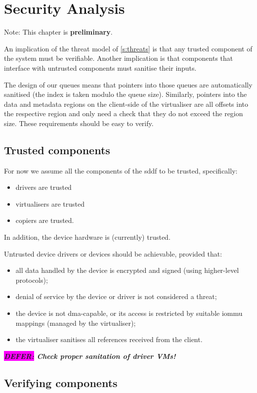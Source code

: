 \documentclass[a4paper,12pt]{report}
\newcommand{\DEFER}[1]{\textbf{\textsl{\colorbox{magenta}{DEFER:} #1}}}
\newcommand{\DEFER}[1]{\relax}
\begin{document}
\chapter{Security Analysis}\label{s:security}

Note: This chapter is \textbf{preliminary}.

An implication of the threat model of \autoref{s:threats} is that any
trusted component of the system must be verifiable. Another implication is
that components that interface with untrusted components must sanitise
their inputs.

The design of our queues means that
pointers into those queues are automatically sanitised (the index is
taken modulo the queue size). Similarly, pointers into the data and metadata
regions on the client-side of the virtualiser are all offsets into the
respective region and only need a check that they do not exceed the
region size. These requirements should be easy to verify.

\section{Trusted components}

For now we assume all the components of the \gls{sddf} to be trusted, specifically:
\begin{itemize}
\item drivers are trusted
\item virtualisers are trusted
\item copiers are trusted.
\end{itemize}
In addition, the device hardware is (currently) trusted.

Untrusted device drivers or devices should be achievable, provided that:
\begin{itemize}
\item all data handled by the device is encrypted and signed (using
  higher-level protocols);
\item denial of service by the device or driver is not considered a
  threat;
\item the device is not \gls{dma}-capable, or its access is restricted by
  suitable \gls{iommu} mappings (managed by the virtualiser);
\item the virtualiser sanitises all references received from the client.
\end{itemize}
\DEFER{Check proper sanitation of driver VMs!}

\section{Verifying components}
\end{document}
